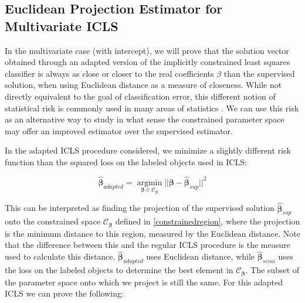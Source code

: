 \documentclass[smallcondensed]{svjour3}
\begin{document}

\subsection{Euclidean Projection Estimator for Multivariate ICLS}

In the multivariate case (with intercept), we will prove that the solution vector obtained through an adapted version of the implicitly constrained least squares classifier is always as close or closer to the real coefficients $\beta$ than the supervised solution, when using Euclidean distance as a measure of closeness. While not directly equivalent to the goal of classification error, this different notion of statistical risk is commonly used in many areas of statistics \cite{Berger1985}. We can use this risk as an alternative way to study in what sense the constrained parameter space may offer an improved estimator over the supervised estimator.

In the adapted ICLS procedure considered, we minimize a slightly different risk function than the squared loss on the labeled objects used in ICLS:

\begin{equation} \label{eq:adaptedICLS}
\boldsymbol{\hat{\beta}}_{adapted} = \operatorname*{argmin}_{\boldsymbol{\beta} \in \mathcal{C}_{\boldsymbol{\beta}}}  ||\boldsymbol{\beta}-\boldsymbol{\hat{\beta}}_{sup}||^2 
\end{equation}

This can be interpreted as finding the projection of the supervised solution $\boldsymbol{\hat{\beta}}_{sup}$ onto the constrained space $\mathcal{C}_{\boldsymbol{\beta}}$ defined in \ref{constrainedregion}, where the projection is the minimum distance to this region, measured by the Euclidean distance. Note that the difference between this and the regular ICLS procedure is the measure used to calculate this distance. $\boldsymbol{\hat{\beta}}_{adapted}$ uses Euclidean distance, while $\boldsymbol{\hat{\beta}}_{semi}$ uses the loss on the labeled objects to determine the best element in $\mathcal{C}_{\boldsymbol{\beta}}$. The subset of the parameter space onto which we project is still the same. For this adapted ICLS we can prove the following:
\end{document}
